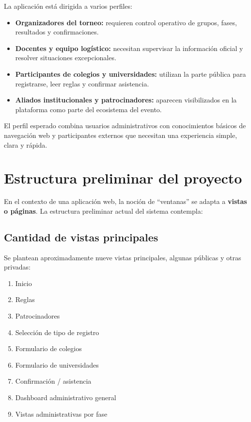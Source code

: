 \documentclass[12pt,a4paper]{article}
\begin{document}
La aplicación está dirigida a varios perfiles:

\begin{itemize}[leftmargin=1.2cm]
    \item \textbf{Organizadores del torneo:} requieren control operativo de grupos, fases, resultados y confirmaciones.
    \item \textbf{Docentes y equipo logístico:} necesitan supervisar la información oficial y resolver situaciones excepcionales.
    \item \textbf{Participantes de colegios y universidades:} utilizan la parte pública para registrarse, leer reglas y confirmar asistencia.
    \item \textbf{Aliados institucionales y patrocinadores:} aparecen visibilizados en la plataforma como parte del ecosistema del evento.
\end{itemize}

El perfil esperado combina usuarios administrativos con conocimientos básicos de navegación web y participantes externos que necesitan una experiencia simple, clara y rápida.

\section{Estructura preliminar del proyecto}

En el contexto de una aplicación web, la noción de ``ventanas'' se adapta a \textbf{vistas o páginas}. La estructura preliminar actual del sistema contempla:

\subsection{Cantidad de vistas principales}

Se plantean aproximadamente nueve vistas principales, algunas públicas y otras privadas:

\begin{enumerate}[leftmargin=1.2cm]
    \item Inicio
    \item Reglas
    \item Patrocinadores
    \item Selección de tipo de registro
    \item Formulario de colegios
    \item Formulario de universidades
    \item Confirmación / asistencia
    \item Dashboard administrativo general
    \item Vistas administrativas por fase
\end{enumerate}
\end{document}
